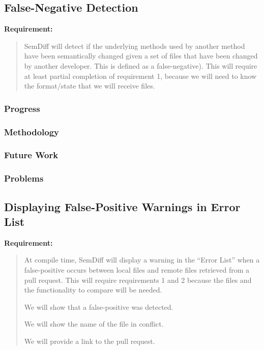 \documentclass[draftclsnofoot,onecolumn]{IEEEtran}
\begin{document}
\subsection{False-Negative Detection}

\textbf{Requirement:}

\begin{quote}

SemDiff will detect if the underlying methods used by another method have been semantically changed given a set of files that have been changed by another developer. This is defined as a false-negative). This will require at least partial completion of requirement 1, because we will need to know the format/state that we will receive files.

\end{quote}

\subsubsection{Progress}

\subsubsection{Methodology}

\subsubsection{Future Work}

\subsubsection{Problems}






\subsection{Displaying False-Positive Warnings in Error List}

\textbf{Requirement:}

\begin{quote}

At compile time, SemDiff will display a warning in the “Error List” when a false-positive occurs between local files and remote files retrieved from a pull request. This will require requirements 1 and 2 because the files and the functionality to compare will be needed.

We will show that a false-positive was detected.

We will show the name of the file in conflict.

We will provide a link to the pull request.

\end{quote}
\end{document}
